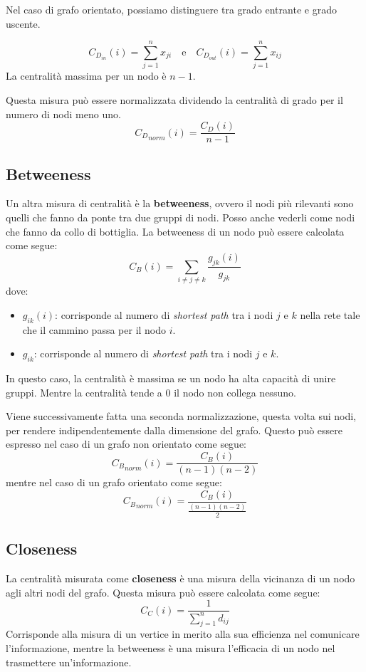 Nel caso di grafo orientato, possiamo distinguere tra grado entrante e grado
uscente.

\begin{equation}
    C_{D_{in}}(i) = \sum_{j=1}^{n} x_{ji} \quad \text{e} \quad
    C_{D_{out}}(i) = \sum_{j=1}^{n} x_{ij}
\end{equation}
La centralità massima per un nodo è $n - 1$.

Questa misura può essere normalizzata
dividendo la centralità di grado per il numero di nodi meno uno.
\begin{equation*}
    {C_D}_{norm} (i)= \frac{C_D(i)}{n-1}
\end{equation*}
\subsection{Betweeness}
Un altra misura di centralità è la \textbf{betweeness}, ovvero il nodi più
rilevanti sono quelli che fanno da ponte tra due gruppi di nodi. Posso anche
vederli come nodi che fanno da collo di bottiglia. La betweeness di un nodo
può essere calcolata come segue:
\begin{equation}
    C_B(i) = \sum_{i \neq j \neq k} \frac{g_{jk}(i)}{g_{jk}}
\end{equation}
dove:
\begin{itemize}
    \item $g_{ik}(i)$: corrisponde al numero di \textit{shortest path} tra i
          nodi $j$ e $k$ nella rete tale che il cammino passa per il nodo $i$.
    \item $g_{ik}$: corrisponde al numero di \textit{shortest path} tra i nodi
          $j$ e $k$.
\end{itemize}
In questo caso, la centralità è massima se un nodo ha alta capacità di unire
gruppi. Mentre la centralità tende a $0$ il nodo non collega nessuno.

Viene successivamente fatta una seconda normalizzazione, questa volta sui nodi,
per rendere indipendentemente dalla dimensione del grafo. Questo può essere
espresso nel caso di un grafo non orientato come segue:
\begin{equation}
    {C_B}_{norm}(i) = \frac{C_B(i)}{(n - 1)(n - 2)}
\end{equation}
mentre nel caso di un grafo orientato come segue:
\begin{equation}
    {C_B}_{norm}(i) = \frac{C_B(i)}{\frac{(n - 1)(n - 2)}{2}}
\end{equation}
\subsection{Closeness}
La centralità misurata come \textbf{closeness} è una misura della vicinanza di
un nodo agli altri nodi del grafo. Questa misura può essere calcolata come segue:
\begin{equation}
    C_C(i) = \frac{1}{\sum_{j=1}^{n} d_{ij}}
\end{equation}
Corrisponde alla misura di un vertice in merito alla sua efficienza nel
comunicare l'informazione, mentre la betweeness è una misura l'efficacia di un
nodo nel trasmettere un'informazione.

